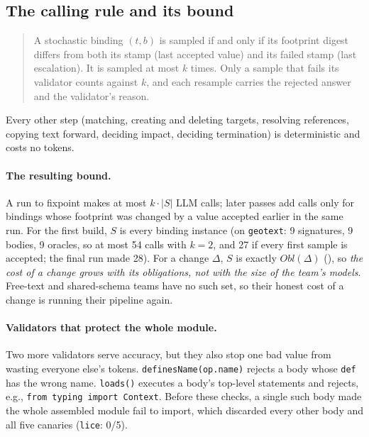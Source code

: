 \documentclass[10pt,a4paper]{article}
\newcommand{\Obl}{\mathit{Obl}}
\newcommand{\code}[1]{\texttt{#1}}
\theoremstyle{definition}
\begin{document}
\subsection{The calling rule and its bound}

\begin{quote}
A stochastic binding $(t,b)$ is sampled if and only if its footprint digest
differs from both its stamp (last accepted value) and its failed stamp (last
escalation). It is sampled at most $k$ times. Only a sample that fails its
validator counts against $k$, and each resample carries the rejected answer
and the validator's reason.
\end{quote}

\noindent Every other step (matching, creating and deleting targets,
resolving references, copying text forward, deciding impact, deciding
termination) is deterministic and costs no tokens.

\paragraph{The resulting bound.} A run to fixpoint makes at most
$k\cdot|S|$ LLM calls; later passes add calls only for bindings whose
footprint was changed by a value accepted earlier in the same run. For the
first build, $S$ is every binding instance (on \texttt{geotext}: 9
signatures, 9 bodies, 9 oracles, so at most 54 calls with $k=2$, and 27 if
every first sample is accepted; the final run made 28). For a change
$\Delta$, $S$ is exactly $\Obl(\Delta)$ (), so \emph{the
cost of a change grows with its obligations, not with the size of the
team's models}. Free-text and shared-schema teams have no such set, so their
honest cost of a change is running their pipeline again.

\paragraph{Validators that protect the whole module.} Two more validators
serve accuracy, but they also stop one bad value from wasting everyone
else's tokens. \code{definesName(op.name)} rejects a body whose \code{def}
has the wrong name. \code{loads()} executes a body's top-level statements
and rejects, e.g., \code{from typing import Context}. Before these checks, a
single such body made the whole assembled module fail to import, which
discarded every other body and all five canaries (\texttt{lice}: 0/5).
\end{document}
